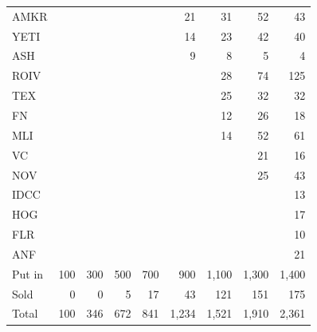 \documentclass[11pt,a4paper]{article}
\begin{document}
{\begin{longtable}{l r r r r r r r r }
AMKR &  &  &  &  & 21 & 31 & 52 & 43 \\
YETI &  &  &  &  & 14 & 23 & 42 & 40 \\
ASH &  &  &  &  & 9 & 8 & 5 & 4 \\
ROIV &  &  &  &  &  & 28 & 74 & 125 \\
TEX &  &  &  &  &  & 25 & 32 & 32 \\
FN &  &  &  &  &  & 12 & 26 & 18 \\
MLI &  &  &  &  &  & 14 & 52 & 61 \\
VC &  &  &  &  &  &  & 21 & 16 \\
NOV &  &  &  &  &  &  & 25 & 43 \\
IDCC &  &  &  &  &  &  &  & 13 \\
HOG &  &  &  &  &  &  &  & 17 \\
FLR &  &  &  &  &  &  &  & 10 \\
ANF &  &  &  &  &  &  &  & 21 \\
\hline
Put in & 100 & 300 & 500 & 700 & 900 & 1,100 & 1,300 & 1,400 \\
Sold & 0 & 0 & 5 & 17 & 43 & 121 & 151 & 175 \\
Total & 100 & 346 & 672 & 841 & 1,234 & 1,521 & 1,910 & 2,361 \\
\hline
\end{longtable}}
\end{document}
